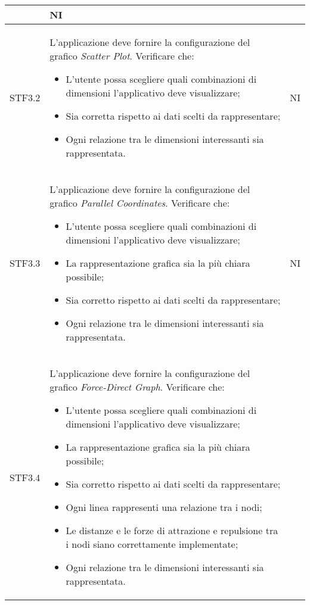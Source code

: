\begin{center}
\begin{longtable}{|p{1.5cm}|p{11cm}|p{1cm}|}
\begin{itemize}
        \end{itemize} & NI\\ \hline
        \rowcolor[HTML]{C0C0C0}
        STF3.2 & L'applicazione deve fornire la configurazione del grafico \textit{Scatter Plot}. Verificare che: \begin{itemize}
            \item L'utente possa scegliere quali combinazioni di dimensioni l'applicativo deve visualizzare;
            \item Sia corretta rispetto ai dati scelti da rappresentare;
            \item Ogni relazione tra le dimensioni interessanti sia rappresentata.
        \end{itemize} & NI\\ \hline
        \rowcolor[HTML]{EFEFEF}
        STF3.3 & L'applicazione deve fornire la configurazione del grafico \textit{Parallel Coordinates}. Verificare che: \begin{itemize}
            \item L'utente possa scegliere quali combinazioni di dimensioni l'applicativo deve visualizzare;
            \item La rappresentazione grafica sia la più chiara possibile;
            \item Sia corretto rispetto ai dati scelti da rappresentare;
            \item Ogni relazione tra le dimensioni interessanti sia rappresentata.
        \end{itemize} & NI\\ \hline
        \rowcolor[HTML]{C0C0C0}
        STF3.4 & L'applicazione deve fornire la configurazione del grafico \textit{Force-Direct Graph}. Verificare che: \begin{itemize}
            \item L'utente possa scegliere quali combinazioni di dimensioni l'applicativo deve visualizzare;
            \item La rappresentazione grafica sia la più chiara possibile;
            \item Sia corretto rispetto ai dati scelti da rappresentare;
            \item Ogni linea rappresenti una relazione tra i nodi;
            \item Le distanze e le forze di attrazione e repulsione tra i nodi siano correttamente implementate;
            \item Ogni relazione tra le dimensioni interessanti sia rappresentata.

\end{itemize}
\end{longtable}
\end{center}
